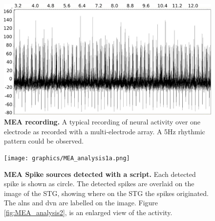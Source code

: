 \begin{figure}[H]
	\begin{center}
		\includegraphics[width=13cm]{graphics/MEA_recording.png}
		\caption[\ac{MEA} Recording]{\textbf{MEA recording. }A typical recording of neural activity over one electrode as recorded with a multi-electrode array. A 5Hz rhythmic pattern could be observed.}
		\label{fig:MEA_recording}
	\end{center}
\end{figure}
\begin{figure}[H]
	\begin{center}
		\texttt{[image: graphics/MEA\_analysis1a.png]}
		\caption[\ac{MEA} Spike sources detected with a \matlab script.]{\textbf{\ac{MEA} Spike sources detected with a \matlab script.} Each detected spike is shown as circle. The detected spikes are overlaid on the image of the \ac{STG}, showing where on the \ac{STG} the spikes originated. The \acp{aln} and \ac{dvn} are labelled on the image. Figure \ref{fig:MEA_analysis2}, is an enlarged view of the activity.}
		\label{fig:MEA_analysis1a}
	\end{center}
\end{figure}
